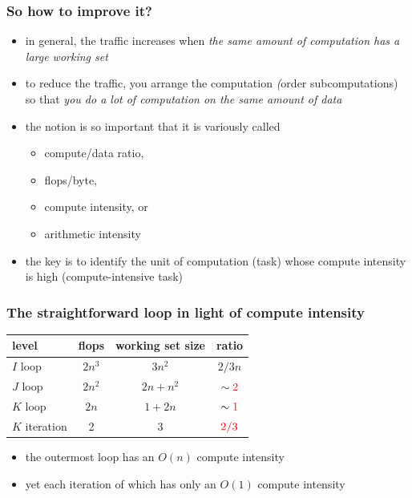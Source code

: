 \documentclass[12pt,dvipdfmx]{beamer}
\newcommand{\ao}[1]{{\color{blue}#1}}
\newcommand{\aka}[1]{{\color{red}#1}}
\begin{document}
\begin{frame}
\frametitle{So how to improve it?}
\begin{itemize}
\item<1-> in general, the traffic increases when 
  \ao{\emph{the same amount of computation has a large working set}}
\item<2-> to reduce the traffic, you arrange the computation
  \ao{\emph (order subcomputations)} so that
  \ao{\emph{you do a lot of computation on the same amount of data}}
\item<3-> the notion is so important that it is variously called
  \begin{itemize}
  \item \ao{compute/data ratio,}
  \item \ao{flops/byte,} 
  \item \ao{compute intensity,} or
  \item \ao{arithmetic intensity}
  \end{itemize}
\item<4-> the key is to identify the unit of computation (task) 
  whose compute intensity is high \ao{(compute-intensive task)}
\end{itemize}
\end{frame}


\begin{frame}
\frametitle{The straightforward loop in light of compute intensity}

\begin{center}
\begin{tabular}{|l|c|c|c|}\hline
level         & flops  & working set size & ratio    \\\hline
$I$ loop      & $2n^3$ & $3n^2$           & $2/3n$   \\  
$J$ loop      & $2n^2$ & $2n + n^2$       & $\sim \aka{2}$ \\  
$K$ loop      & $2n$   & $1 + 2n$         & $\sim \aka{1}$ \\
$K$ iteration & 2      & $3$              & $\aka{2/3}$    \\\hline
\end{tabular}
\end{center}

\begin{itemize}
\item the outermost loop has an $O(n)$ compute intensity
\item yet each iteration of which has only an $O(1)$ compute intensity
\end{itemize}
\end{frame}
\end{document}

